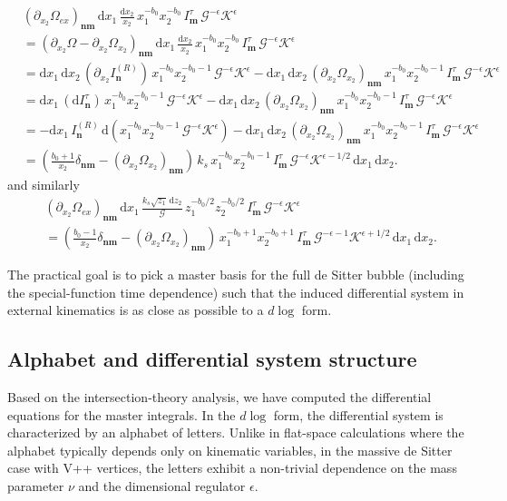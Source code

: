 \documentclass[a4paper]{article}
\newcommand{\n}{\nonumber}
\def\di{{\mathrm{d}}}
\def\ep{\epsilon}
\newcommand{\mG}{\mathcal{G}}
\newcommand{\mK}{\mathcal{K}}
\begin{document}
\begin{align*}
	&(\partial_{x_2}\Omega_{ex})_{\bm n \bm m}\,\di x_1\,\frac{\di x_2}{x_2}\,x_1^{-b_0}x_2^{-b_0}\,I^{\tau}_{\bm m}\,\mG^{-\ep}\mK^{\ep} \n\\
	&= (\partial_{x_2}\Omega-\partial_{x_2}\Omega_{x_2})_{\bm n \bm m}\,\di x_1\,\frac{\di x_2}{x_2}\,x_1^{-b_0}x_2^{-b_0}\,I^{\tau}_{\bm m}\,\mG^{-\ep}\mK^{\ep} \n\\
	&= \di x_1\,\di x_2\,(\partial_{x_2}I^{(R)}_{\bm n})\,x_1^{-b_0}x_2^{-b_0-1}\,\mG^{-\ep}\mK^{\ep} 
	- \di x_1\,\di x_2\,(\partial_{x_2}\Omega_{x_2})_{\bm n \bm m}\,x_1^{-b_0}x_2^{-b_0-1}\,I^{\tau}_{\bm m}\,\mG^{-\ep}\mK^{\ep} \n\\
	&= \di x_1\,(\di I^{\tau}_{\bm n})\,x_1^{-b_0}x_2^{-b_0-1}\,\mG^{-\ep}\mK^{\ep} 
	- \di x_1\,\di x_2\,(\partial_{x_2}\Omega_{x_2})_{\bm n \bm m}\,x_1^{-b_0}x_2^{-b_0-1}\,I^{\tau}_{\bm m}\,\mG^{-\ep}\mK^{\ep} \n\\
	&= -\di x_1\,I^{(R)}_{\bm n}\,\di\!\left( x_1^{-b_0}x_2^{-b_0-1}\,\mG^{-\ep}\mK^{\ep} \right) 
	- \di x_1\,\di x_2\,(\partial_{x_2}\Omega_{x_2})_{\bm n \bm m}\,x_1^{-b_0}x_2^{-b_0-1}\,I^{\tau}_{\bm m}\,\mG^{-\ep}\mK^{\ep} \n\\
	&= \left(\frac{b_0+1}{x_2}\delta_{\bm n \bm m}-(\partial_{x_2}\Omega_{x_2})_{\bm n \bm m}\right)\,k_s\,x_1^{-b_0}x_2^{-b_0-1}\,I^{\tau}_{\bm m}\,\mG^{-\ep}\mK^{\ep-1/2}\,\di x_1\,\di x_2.
\end{align*}
and similarly
\begin{align*}
	&(\partial_{x_2}\Omega_{ex})_{\bm n \bm m}\,\di x_1\,\frac{k_s\sqrt{z_1}\,\di z_2}{\mG}\,z_1^{-b_0/2}z_2^{-b_0/2}\,I^{\tau}_{\bm m}\,\mG^{-\ep}\mK^{\ep} \n\\
	&= \left(\frac{b_0-1}{x_2}\delta_{\bm n \bm m}-(\partial_{x_2}\Omega_{x_2})_{\bm n \bm m}\right)\,x_1^{-b_0+1}x_2^{-b_0+1}\,I^{\tau}_{\bm m}\,\mG^{-\ep-1}\mK^{\ep+1/2}\,\di x_1\,\di x_2.
\end{align*}

The practical goal is to pick a master basis for the full de Sitter bubble (including the special-function time dependence) such that the induced differential system in external kinematics is as close as possible to a $d\log$ form.

\subsection{Alphabet and differential system structure}
Based on the intersection-theory analysis, we have computed the differential equations for the master integrals.
In the $d\log$ form, the differential system is characterized by an alphabet of letters.
Unlike in flat-space calculations where the alphabet typically depends only on kinematic variables, in the massive de Sitter case with V++ vertices, the letters exhibit a non-trivial dependence on the mass parameter $\nu$ and the dimensional regulator $\epsilon$.
\end{document}
